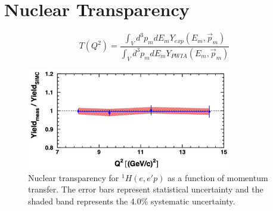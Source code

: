 \section{Nuclear Transparency}

\begin{equation}
    T(Q^2) = \frac{\int_{V} d^{3} p_{m} d E_{m} Y_{exp }(E_{m}, \vec{p}_{m})}
                  {\int_{V} d^{3} p_{m} d E_{m} Y_{PWIA}(E_{m}, \vec{p}_{m})}
\end{equation}


\begin{figure}[!h]
    \centering
    \includegraphics[width=0.8\textwidth]{chap5/lh2_results.png}
    \caption{
            Nuclear transparency for ${}^{1}H(e,e'p)$ as a function of
            momentum transfer.
            The error bars represent statistical uncertainty and the
            shaded band represents the 4.0\% systematic uncertainty.
            }
    \label{fig:lh2_transparency_results}
\end{figure}




